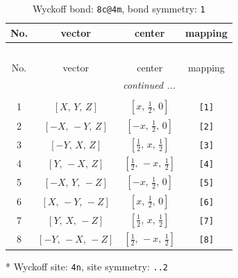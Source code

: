 \documentclass[fleqn,8pt]{jsarticle}
\begin{document}
\renewcommand{\arraystretch}{1.2}
\begin{longtable}{cccc}
\caption{Wyckoff bond: {\tt 8c@4m}, bond symmetry: {\tt 1}}
 \\
 \hline \hline
No. & vector & center & mapping \\ \hline \endfirsthead

\multicolumn{3}{l}{\tablename\ \thetable{}} \\
 \hline \hline
No. & vector & center & mapping \\ \hline \endhead

 \hline \hline
\multicolumn{3}{r}{\footnotesize\it continued ...} \\ \endfoot

 \hline \hline
\multicolumn{3}{r}{} \\ \endlastfoot

1 & $\left[ X,\, Y,\, Z \right]$ & $\left[ x,\, \frac{1}{2},\, 0 \right]$ & {\tt [1]} \\ \hline
2 & $\left[ - X,\, - Y,\, Z \right]$ & $\left[ - x,\, \frac{1}{2},\, 0 \right]$ & {\tt [2]} \\ \hline
3 & $\left[ - Y,\, X,\, Z \right]$ & $\left[ \frac{1}{2},\, x,\, \frac{1}{2} \right]$ & {\tt [3]} \\ \hline
4 & $\left[ Y,\, - X,\, Z \right]$ & $\left[ \frac{1}{2},\, - x,\, \frac{1}{2} \right]$ & {\tt [4]} \\ \hline
5 & $\left[ - X,\, Y,\, - Z \right]$ & $\left[ - x,\, \frac{1}{2},\, 0 \right]$ & {\tt [5]} \\ \hline
6 & $\left[ X,\, - Y,\, - Z \right]$ & $\left[ x,\, \frac{1}{2},\, 0 \right]$ & {\tt [6]} \\ \hline
7 & $\left[ Y,\, X,\, - Z \right]$ & $\left[ \frac{1}{2},\, x,\, \frac{1}{2} \right]$ & {\tt [7]} \\ \hline
8 & $\left[ - Y,\, - X,\, - Z \right]$ & $\left[ \frac{1}{2},\, - x,\, \frac{1}{2} \right]$ & {\tt [8]} \\
\end{longtable}
* Wyckoff site: {\tt 4n}, site symmetry: {\tt ..2}
\renewcommand{\arraystretch}{1.2}
\end{document}
